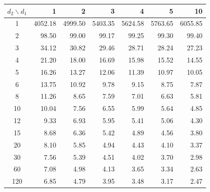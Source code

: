 \begin{center}
\small
\setlength{\tabcolsep}{6pt}
\begin{tabular}{c*{6}{r}}
\toprule
$d_2\backslash d_1$ & 1 & 2 & 3 & 4 & 5 & 10 \\
\midrule
1 & 4052.18 & 4999.50 & 5403.35 & 5624.58 & 5763.65 & 6055.85 \\
2 & 98.50 & 99.00 & 99.17 & 99.25 & 99.30 & 99.40 \\
3 & 34.12 & 30.82 & 29.46 & 28.71 & 28.24 & 27.23 \\
4 & 21.20 & 18.00 & 16.69 & 15.98 & 15.52 & 14.55 \\
5 & 16.26 & 13.27 & 12.06 & 11.39 & 10.97 & 10.05 \\
6 & 13.75 & 10.92 & 9.78 & 9.15 & 8.75 & 7.87 \\
8 & 11.26 & 8.65 & 7.59 & 7.01 & 6.63 & 5.81 \\
10 & 10.04 & 7.56 & 6.55 & 5.99 & 5.64 & 4.85 \\
12 & 9.33 & 6.93 & 5.95 & 5.41 & 5.06 & 4.30 \\
15 & 8.68 & 6.36 & 5.42 & 4.89 & 4.56 & 3.80 \\
20 & 8.10 & 5.85 & 4.94 & 4.43 & 4.10 & 3.37 \\
30 & 7.56 & 5.39 & 4.51 & 4.02 & 3.70 & 2.98 \\
60 & 7.08 & 4.98 & 4.13 & 3.65 & 3.34 & 2.63 \\
120 & 6.85 & 4.79 & 3.95 & 3.48 & 3.17 & 2.47 \\

\bottomrule
\end{tabular}
\end{center}